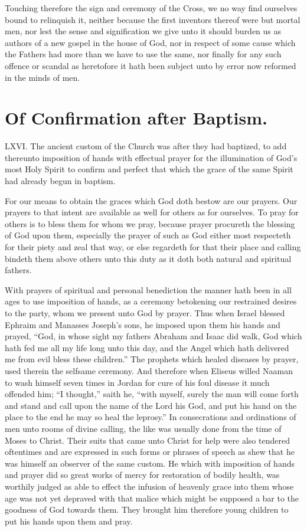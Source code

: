 Touching therefore the sign and ceremony of the Cross, we no way find ourselves bound to relinquish it, neither because the first inventors thereof were but mortal men, nor lest the sense and signification we give unto it should burden us as authors of a new gospel in the house of God, nor in respect of some cause which the Fathers had more than we have to use the same, nor finally for any such offence or scandal as heretofore it hath been subject unto by error now reformed in the minds of men.


\section*{Of Confirmation after Baptism.}
LXVI. The ancient custom of the Church was after they had baptized, to add thereunto imposition of hands with effectual prayer for the illumination of God’s most Holy Spirit to confirm and perfect that which the grace of the same Spirit had already begun in baptism.

For our means to obtain the graces which God doth bestow are our prayers. Our prayers to that intent are available as well for others as for ourselves. To pray for others is to bless them for whom we pray, because prayer procureth the blessing of God upon them, especially the prayer of such as God either most respecteth for their piety and zeal that way, or else regardeth for that their place and calling bindeth them above others unto this duty as it doth both natural and spiritual fathers.

With prayers of spiritual and personal benediction the manner hath been in all ages to use imposition of hands, as a ceremony betokening our restrained desires to the party, whom we present unto God by prayer. Thus when Israel blessed Ephraim and Manasses Joseph’s sons, he imposed upon them his hands and prayed, “God, in whose sight my fathers Abraham and Isaac did walk, God which hath fed me all my life long unto this day, and the Angel which hath delivered me from evil bless these children.” The prophets which healed diseases by prayer, used therein the selfsame ceremony. And therefore when Eliseus willed Naaman to  wash himself seven times in Jordan for cure of his foul disease it much offended him;
 “I thought,” saith he, “with myself, surely the man will come forth and stand and call upon the name of the Lord his God, and put his hand on the place to the end he may so heal the leprosy.” In consecrations and ordinations of men unto rooms of divine calling, the like was usually done from the time of Moses to Christ. Their suits that came unto Christ for help were also tendered oftentimes and are expressed in such forms or phrases of speech as shew that he was himself an observer of the same custom. He which with imposition of hands and prayer did so great works of mercy for restoration of bodily health, was worthily judged as able to effect the infusion of heavenly grace into them whose age was not yet depraved with that malice which might be supposed a bar to the goodness of God towards them. They brought him therefore young children to put his hands upon them and pray.

